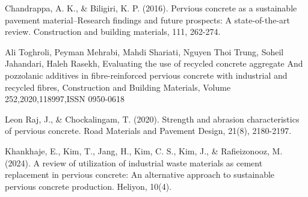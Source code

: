 \documentclass{ieeeaccess}
\begin{document}
\begin{thebibliography}{00}

 Chandrappa, A. K., \& Biligiri, K. P. (2016). Pervious concrete as
a sustainable pavement material–Research findings and future prospects:
A state-of-the-art review. Construction and building materials, 111, 262-274.

 Ali Toghroli, Peyman Mehrabi, Mahdi Shariati, Nguyen Thoi Trung,
Soheil Jahandari, Haleh Rasekh, Evaluating the use of recycled concrete
aggregate And pozzolanic additives in fibre-reinforced pervious concrete with
industrial and recycled fibres, Construction and Building Materials, Volume
252,2020,118997,ISSN 0950-0618 

 Leon Raj, J., \& Chockalingam, T. (2020). Strength and abrasion
    characteristics of pervious concrete. Road Materials and Pavement Design,
        21(8), 2180-2197.

 Khankhaje, E., Kim, T., Jang, H., Kim, C. S., Kim, J., \&
    Rafieizonooz, M.  (2024). A review of utilization of industrial waste
        materials as cement replacement in pervious concrete: An alternative
        approach to sustainable pervious concrete production. Heliyon, 10(4).

\end{thebibliography}


\EOD
\end{document}
